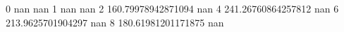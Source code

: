0 nan nan
1 nan nan
2 160.79978942871094 nan
4 241.26760864257812 nan
6 213.9625701904297 nan
8 180.61981201171875 nan
